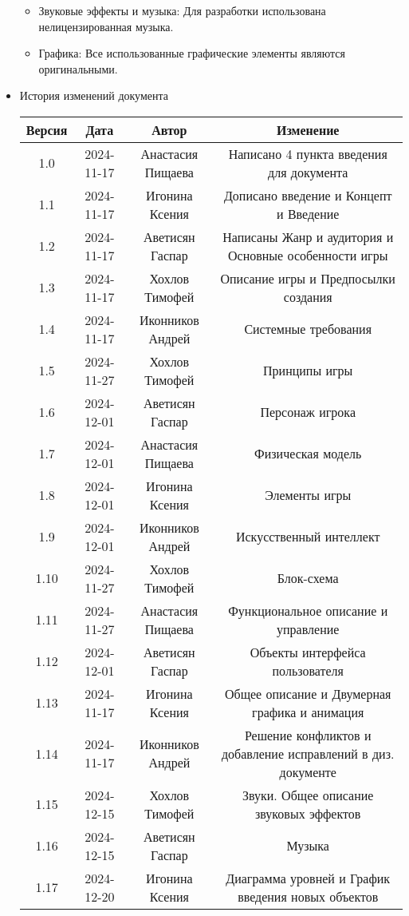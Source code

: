 \documentclass{article}
\begin{document}
\begin{itemize}
\begin{itemize}
\item Звуковые эффекты и музыка: Для разработки использована нелицензированная музыка.

\item Графика: Все использованные графические элементы являются оригинальными.
\end{itemize}

\item История изменений документа
\begin{center}
\begin{tabular}{| c | c | c | c |}
\hline
 Версия & Дата & Автор & Изменение \\  \hline
 1.0 & 2024-11-17 & Анастасия Пищаева & Написано 4 пункта введения для документа\\ \hline
 1.1 & 2024-11-17 & Игонина Ксения & Дописано введение и Концепт и Введение\\  \hline 
 1.2 & 2024-11-17 & Аветисян Гаспар & Написаны Жанр и аудитория и Основные особенности игры\\  \hline
 1.3 & 2024-11-17 & Хохлов Тимофей & Описание игры и Предпосылки создания\\  \hline
 1.4 & 2024-11-17 & Иконников Андрей & Системные требования\\ \hline 
 1.5 & 2024-11-27 & Хохлов Тимофей & Принципы игры\\  \hline
 1.6 & 2024-12-01 & Аветисян Гаспар & Персонаж игрока\\ \hline
 1.7 & 2024-12-01 & Анастасия Пищаева & Физическая модель\\ \hline
 1.8 & 2024-12-01 & Игонина Ксения & Элементы игры\\ \hline
 1.9 & 2024-12-01 & Иконников Андрей & Искусственный интеллект\\ \hline
 1.10 & 2024-11-27 & Хохлов Тимофей & Блок-схема\\  \hline
 1.11 & 2024-11-27 & Анастасия Пищаева & Функциональное описание и управление\\  \hline
 1.12 & 2024-12-01 & Аветисян Гаспар & Объекты интерфейса пользователя\\ \hline
 1.13 & 2024-11-17 & Игонина Ксения & Общее описание и Двумерная графика и анимация\\  \hline
 1.14 & 2024-11-17 & Иконников Андрей & Решение конфликтов и добавление исправлений в диз. документе\\  \hline
 1.15 & 2024-12-15 & Хохлов Тимофей & Звуки. Общее описание звуковых эффектов\\  \hline
 1.16 & 2024-12-15 & Аветисян Гаспар & Музыка\\  \hline
 1.17 & 2024-12-20 & Игонина Ксения & Диаграмма уровней и График введения новых объектов\\ \hline



\end{tabular}
\end{center}
\end{itemize}
\end{document}
